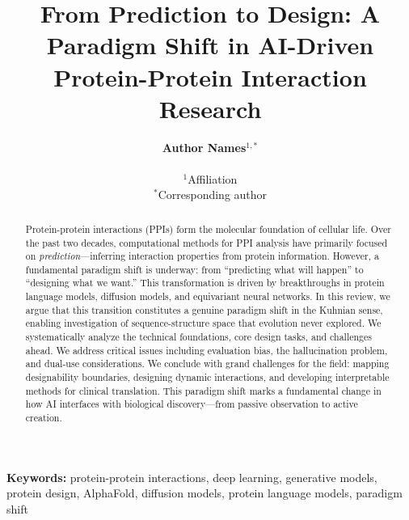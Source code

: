 \documentclass[11pt,a4paper]{article}
\title{\textbf{From Prediction to Design: A Paradigm Shift in AI-Driven Protein-Protein Interaction Research}}
\author{
\textbf{Author Names}$^{1,*}$\\
\\
$^1$Affiliation\\
$^*$Corresponding author
}
\date{}
\begin{document}
\maketitle

\begin{abstract}
\noindent
Protein-protein interactions (PPIs) form the molecular foundation of cellular life. Over the past two decades, computational methods for PPI analysis have primarily focused on \textit{prediction}---inferring interaction properties from protein information. However, a fundamental paradigm shift is underway: from ``predicting what will happen'' to ``designing what we want.'' This transformation is driven by breakthroughs in protein language models, diffusion models, and equivariant neural networks. In this review, we argue that this transition constitutes a genuine paradigm shift in the Kuhnian sense, enabling investigation of sequence-structure space that evolution never explored. We systematically analyze the technical foundations, core design tasks, and challenges ahead. We address critical issues including evaluation bias, the hallucination problem, and dual-use considerations. We conclude with grand challenges for the field: mapping designability boundaries, designing dynamic interactions, and developing interpretable methods for clinical translation. This paradigm shift marks a fundamental change in how AI interfaces with biological discovery---from passive observation to active creation.
\end{abstract}

\noindent\textbf{Keywords:} protein-protein interactions, deep learning, generative models, protein design, AlphaFold, diffusion models, protein language models, paradigm shift

\vspace{1em}

\tableofcontents
\newpage












\end{document}
